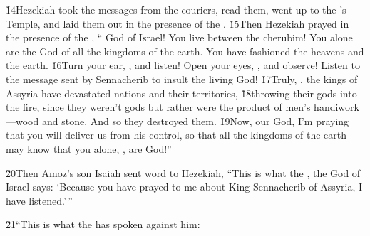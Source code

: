 \v{14}Hezekiah took the messages from the couriers, read them, went up to the 's Temple, and laid them out in the presence of the . \v{15}Then Hezekiah prayed in the presence of the , `` God of Israel! You live between the cherubim! You alone are the God of all the kingdoms of the earth. You have fashioned the heavens and the earth. \v{16}Turn your ear, , and listen! Open your eyes, , and observe! Listen to the message sent by Sennacherib to insult the living God! \v{17}Truly, , the kings of Assyria have devastated nations and their territories, \v{18}throwing their gods into the fire, since they weren't gods but rather were the product of men's handiwork---wood and stone. And so they destroyed them. \v{19}Now,  our God, I'm praying that you will deliver us from his control, so that all the kingdoms of the earth may know that you alone, , are God!''

\v{20}Then Amoz's son Isaiah sent word to Hezekiah, ``This is what the , the God of Israel says: `Because you have prayed to me about King Sennacherib of Assyria, I have listened.'\,''

\v{21}``This is what the  has spoken against him:

